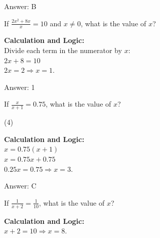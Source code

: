 \documentclass[11pt,paper=a4,answers]{exam}
\begin{document}
\begin{questions}
\begin{solution}
\vspace{30pt}

Answer: \colorbox{yellow!100}{B}
\end{solution}

\vspace{40pt}

\question
If $\frac{2x^2 + 8x}{x} = 10$ and $x \neq 0$, what is the value of $x$?

\begin{solution}
\textbf{Calculation and Logic:} \\
Divide each term in the numerator by $x$: \\
$2x + 8 = 10$ \\
$2x = 2 \Rightarrow x = 1$.

\vspace{30pt}

Answer: \colorbox{yellow!100}{1}
\end{solution}

\vspace{40pt}

\question
If $\frac{x}{x+1} = 0.75$, what is the value of $x$?
\begin{tasks}(4)
\end{tasks}

\begin{solution}
\textbf{Calculation and Logic:} \\
$x = 0.75(x + 1)$ \\
$x = 0.75x + 0.75$ \\
$0.25x = 0.75 \Rightarrow x = 3$.

\vspace{30pt}

Answer: \colorbox{yellow!100}{C}
\end{solution}

\vspace{40pt}

\question
If $\frac{1}{x+2} = \frac{1}{10}$, what is the value of $x$?

\begin{solution}
\textbf{Calculation and Logic:} \\
$x + 2 = 10 \Rightarrow x = 8$.

\vspace{30pt}


\end{solution}
\end{questions}
\end{document}
